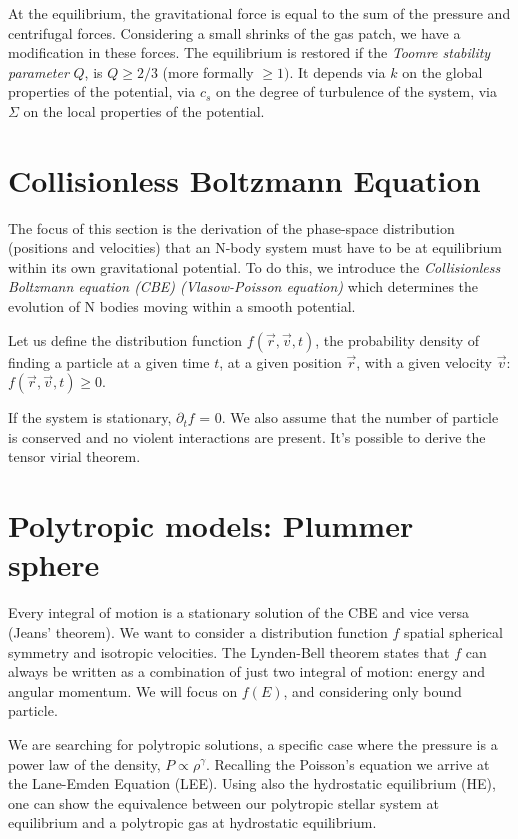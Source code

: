 \documentclass[a4paper,12pt]{article}
\begin{document}
At the equilibrium, the gravitational force is equal to the sum of the pressure and centrifugal forces. Considering a small shrinks of the gas patch, we have a modification in these forces. The equilibrium is restored if the \textit{Toomre stability parameter} $Q$, is  $Q \geqslant 2/3$ (more formally $\geqslant 1)$. It depends via $k$ on the global properties of the potential, via $c_s$ on the degree of turbulence of the system, via $\Sigma$ on the local properties of the potential.




\section{Collisionless Boltzmann Equation}

The focus of this section is the derivation of the phase-space distribution (positions and velocities) that an N-body system must have to be at equilibrium within its own gravitational potential. To do this, we introduce the \textit{ Collisionless Boltzmann equation (CBE) (Vlasow-Poisson equation)} which determines the evolution of N bodies moving within a smooth potential.

Let us define the distribution function $f(\vec{r}, \vec{v}, t)$, the probability density of finding a particle at a given time $t$, at a given position $\vec{r}$, with a given velocity $\vec{v}$: $f(\vec{r}, \vec{v}, t) \geqslant 0$.

If the system is stationary, $\partial_t f$ = 0. We also assume that the number of particle is conserved and no violent interactions are present. It's possible to derive the tensor virial theorem. 




\section{Polytropic models: Plummer sphere}

Every integral of motion is a stationary solution of the CBE and vice versa (Jeans' theorem). We want to consider a distribution function $f$ spatial spherical symmetry and isotropic velocities. The Lynden-Bell theorem states that $f$ can always be written as a combination of just two integral of motion: energy and angular momentum. We will focus on $f(E)$, and considering only bound particle.

We are searching for polytropic solutions, a specific case where the pressure is a power law of the density, $ P \propto \rho^\gamma$. Recalling the Poisson's equation we arrive at the Lane-Emden Equation (LEE). Using also the hydrostatic equilibrium (HE), one can show the equivalence between our polytropic stellar system at equilibrium and a polytropic gas at hydrostatic equilibrium.
\end{document}
